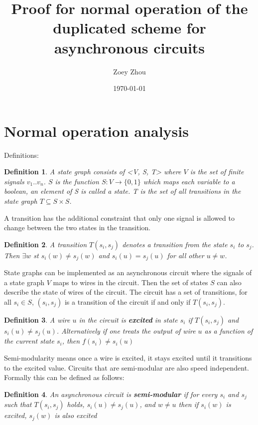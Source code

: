\documentclass{article}
\title{Proof for normal operation of the duplicated scheme for asynchronous circuits}
\author{Zoey Zhou}
\date{\today}
\newtheorem*{definition}{Definition}
\begin{document}
\section{Normal operation analysis}
Definitions:  
\begin{definition}A state graph consists of <V, S, T> where $V$ is the set of finite signals $v_1 .. v_n$.  $S$ is the function $S: V \to \{0,1\}$ %
which maps each variable to a boolean, an element of S is called a state. T is the set of all transitions in the state graph $T \subseteq S \times S$.  \end{definition}

A transition has the additional constraint that only one signal is allowed to change between the two states in the transition.
\begin{definition}A transition $T(s_i, s_j)$ denotes a transition from the state $s_i$ to $s_j$.  Then $\exists w$ st $s_i(w)\neq s_j(w)$ and $s_i(u)=s_j(u)$ for all other $u \neq w$. 
\end{definition}

State graphs can be implemented as an asynchronous circuit where the signals of a state graph $V$ maps to wires in the circuit. %
Then the set of states $S$ can also describe the state of wires of the circuit.  The circuit has a set of transitions, for all $s_i \in S$, $(s_i, s_j)$ is a transition of the circuit if and only if $T(s_i, s_j)$.%
\begin{definition}A wire $u$ in the circuit is \textbf{excited} in state $s_i$ if $T(s_i,s_j)$ and $s_i(u) \neq s_j(u)$.  Alternatively if one treats the output of wire $u$ as a function of the current state $s_i$, then $f(s_i)\neq s_i(u)$\end{definition}

Semi-modularity means once a wire is excited, it stays excited until it transitions to the excited value.  Circuits that are semi-modular are also speed independent.  Formally this can be defined as follows:
\begin{definition}An asynchronous circuit is \textbf{semi-modular} if for every $s_i$ and $s_j$ such that $T(s_i,s_j)$ holds, $s_i(u) \neq s_j(u)$, and $w\neq u$ then if $s_i(w)$ is excited, $s_j(w)$ is also excited \end{definition}
\end{document}
